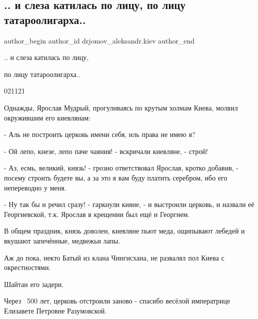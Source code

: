  
 
 
 
 
 
\subsection{.. и слеза катилась по лицу, по лицу татароолигарха..}
\label{sec:03_12_2021.fb.drjomov_aleksandr.kiev.1.tatarooligarh}
 
\ifcmt
 author_begin
   author_id drjomov_aleksandr.kiev
 author_end
\fi

.. и слеза катилась по лицу,

по лицу татароолигарха..

021121

Однажды, Ярослав Мудрый, прогуливаясь по крутым холмам Киева, молвил окружившим
его киевлянам:


- Аль не построить церковь имени себя, иль права не имею я?

- Ой лепо, кнезе, лепо паче чаяния! - вскричали киевляне, - строй!

- Аз, есмь, великий, князь! - грозно ответствовал Ярослав, кротко добавив, -
посему строить будете вы, а за это я вам буду платить серебром, ибо его
непереводно у меня.

- Ну так бы и речил сразу! - гаркнули кияне, - и выстроили церковь, и назвали
её Георгиевской, т.к. Ярослав в крещении был ещё и Георгием.

В общем праздник, князь доволен, киевляне пьют меда, ощипывают лебедей и
вкушают запечённые, медвежьи лапы.

Аж до пока, некто Батый из клана Чингисхана, не развалял пол Киева с
окрестностями.

Шайтан его задери.

Через ~500 лет, церковь отстроили заново - спасибо весёлой императрице
Елизавете Петровне Разумовской.

